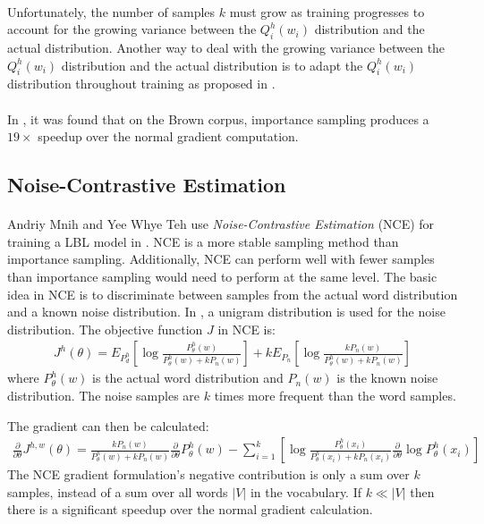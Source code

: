 \paragraph{}
Unfortunately, the number of samples $k$ must grow as training progresses to account for the growing variance between the $Q^h_i(w_i)$ distribution and the actual distribution. 
Another way to deal with the growing variance between the $Q^h_i(w_i)$ distribution and the actual distribution is to adapt the $Q^h_i(w_i)$ distribution throughout training as proposed in \cite{BengioSenecal2008}.
\paragraph{}
In \cite{BengioSenecal2003}, it was found that on the Brown corpus, importance sampling produces a $19\times$ speedup over the normal gradient computation.

\subsection{Noise-Contrastive Estimation}
\paragraph{}
Andriy Mnih and Yee Whye Teh use \emph{Noise-Contrastive Estimation} (NCE) for training a LBL model in \cite{MnihTeh2012}. NCE is a more stable sampling method than importance sampling. Additionally, NCE can perform well with fewer samples than importance sampling would need to perform at the same level.
The basic idea in NCE is to discriminate between samples from the actual word distribution and a known noise distribution. In \cite{MnihTeh2012}, a unigram distribution is used for the noise distribution.
The objective function $J$ in NCE is:
\begin{align}
J^h(\theta) = E_{P_d^h} \left[ \log \frac { P_{\theta}^h(w) } {P_{\theta}^h(w) + k P_n(w)} \right] + kE_{P_n} \left[ \log \frac { k P_n(w) } {P_{\theta}^h(w) + k P_n(w)} \right]
\end{align}
where $P_{\theta}^h(w)$ is the actual word distribution and $P_n(w)$ is the known noise distribution. The noise samples are $k$ times more frequent than the word samples.

The gradient can then be calculated:
\begin{align}
\frac{\partial}{\partial \theta} J^{h,w}(\theta) = \frac {  k P_n(w)  } {P_{\theta}^h(w) + k P_n(w)}  \frac{\partial}{\partial \theta}  P_{\theta}^h(w)
- \sum_{i=1}^{k} \left[ \log \frac { P_{\theta}^h(x_i) } {P_{\theta}^h(x_i) + k P_n(x_i)} \frac{\partial}{\partial \theta} \log P_{\theta}^h(x_i) \right]
\end{align}
The NCE gradient formulation's negative contribution is only a sum over $k$ samples, instead of a sum over all words $|V|$ in the vocabulary. If $k \ll |V|$ then there is a significant speedup over the normal gradient calculation.
